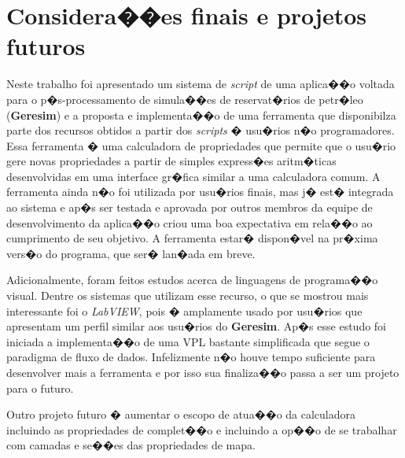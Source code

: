 \documentclass[dissertacao,modelo1,brazil]{ThesisPUC}
\newcommand{\script}{\emph{script}}
\begin{document}
\chapter{Considera��es finais e projetos futuros}

Neste trabalho foi apresentado um sistema de \script{} de uma aplica��o
voltada para o p�s-processamento de simula��es de reservat�rios de petr�leo (\textbf{Geresim})
e a proposta e implementa��o de uma ferramenta que disponibilza parte 
dos recursos  obtidos a partir dos \emph{scripts} � usu�rios n�o programadores.
Essa ferramenta �
uma calculadora de propriedades que permite que o usu�rio gere novas 
propriedades a partir de simples express�es aritm�ticas desenvolvidas em
uma interface gr�fica similar a uma calculadora comum. A ferramenta
ainda n�o foi utilizada por usu�rios finais, mas j� est� integrada ao
sistema e ap�s ser testada e aprovada por outros membros da equipe de desenvolvimento da
aplica��o criou uma boa expectativa em rela��o ao cumprimento de seu objetivo.
A ferramenta estar� dispon�vel na pr�xima vers�o do programa, que
ser� lan�ada em breve.

Adicionalmente, foram feitos estudos acerca de linguagens de programa��o visual.
Dentre os sistemas que utilizam esse recurso, o que se mostrou mais interessante
foi o \emph{LabVIEW}, pois � amplamente usado por usu�rios que apresentam um perfil
similar aos usu�rios do \textbf{Geresim}.
Ap�s esse estudo foi iniciada a 
implementa��o de uma VPL bastante simplificada que segue o paradigma de 
fluxo de dados. Infelizmente n�o houve tempo suficiente para desenvolver mais 
a ferramenta e por isso sua finaliza��o passa a ser um projeto para o futuro.

Outro projeto futuro � aumentar o escopo de atua��o da calculadora
incluindo as propriedades de complet��o e incluindo a op��o de
se trabalhar com camadas e se��es das propriedades de mapa.

\arial


\normalfont
%
\end{document}
